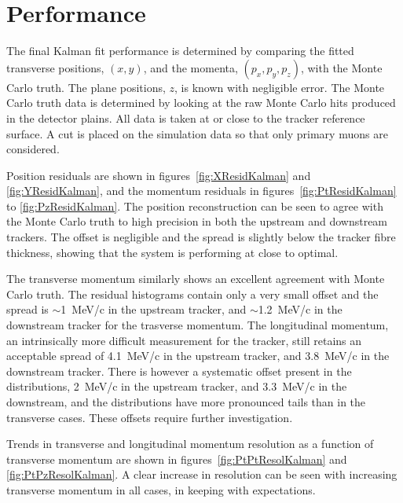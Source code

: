 \section{Performance}
\label{sec:Performance}

  The final Kalman fit performance is determined by comparing the fitted transverse positions, $(x,y)$, and the momenta, $(p_x, p_y, p_z)$, with the Monte Carlo truth. The plane positions, $z$, is known with negligible error. The Monte Carlo truth data is determined by looking at the raw Monte Carlo hits produced in the detector plains.  All data is taken at or close to the tracker reference surface. A cut is placed on the simulation data so that only primary muons are considered. 
  
  Position residuals are shown in figures~\ref{fig:XResidKalman} and \ref{fig:YResidKalman}, and the momentum residuals in figures~\ref{fig:PtResidKalman} to \ref{fig:PzResidKalman}.  The position reconstruction can be seen to agree with the Monte Carlo truth to high precision in both the upstream and downstream trackers. The offset is negligible and the spread is slightly below the tracker fibre thickness, showing that the system is performing at close to optimal.
  
  The transverse momentum similarly shows an excellent agreement with Monte Carlo truth. The residual histograms contain only a very small offset and the spread is $\sim$1~MeV/c in the upstream tracker, and $\sim$1.2~MeV/c in the downstream tracker for the trasverse momentum.  The longitudinal momentum, an intrinsically more difficult measurement for the tracker, still retains an acceptable spread of 4.1~MeV/c in the upstream tracker, and 3.8~MeV/c in the downstream tracker.  There is however a systematic offset present in the distributions, 2~MeV/c in the upstream tracker, and 3.3~MeV/c in the downstream, and the distributions have more pronounced tails than in the transverse cases.  These offsets require further investigation.
  
  Trends in transverse and longitudinal momentum resolution as a function of transverse momentum are shown in figures~\ref{fig:PtPtResolKalman} and \ref{fig:PtPzResolKalman}. A clear increase in resolution can be seen with increasing transverse momentum in all cases, in keeping with expectations.

